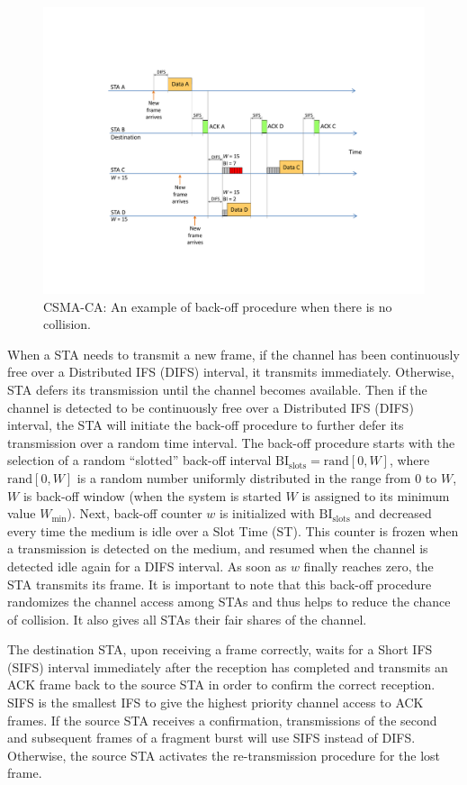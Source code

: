 \begin{figure}[!t]
	\centering
	\includegraphics[width=0.9\columnwidth]{figures2/CSMA-CA-back-off-no-collision}
	\caption{CSMA-CA: An example of back-off procedure when there is no collision.}
	\label{figs:CSMA-CA-back-off-no-collision}
\end{figure}

When a STA needs to transmit a new frame, if the channel has been continuously free over a Distributed IFS (DIFS) interval, it transmits immediately. Otherwise, STA defers its transmission until the channel becomes available. Then if the channel is detected to be continuously free over a Distributed IFS (DIFS) interval, the STA will initiate the back-off procedure to further defer its transmission over a random time interval. The back-off procedure starts with the selection of a random ``slotted'' back-off interval $\mathrm{BI_{slots}} = \mathrm{rand}[0,W]$, where $\mathrm{rand}[0,W]$ is a random number uniformly distributed in the range from $0$ to $W$, $W$ is back-off window (when the system is started $W$ is assigned to its minimum value $W_{\min}$). Next, back-off counter $w$ is initialized with $\mathrm{BI_{slots}}$ and decreased every time the medium is idle over a Slot Time (ST). This counter is frozen when a transmission is detected on the medium, and resumed when the channel is detected idle again for a DIFS interval. As soon as $w$ finally reaches zero, the STA transmits its frame. It is important to note that this back-off procedure randomizes the channel access among STAs and thus helps to reduce the chance of collision. It also gives all STAs their fair shares of the channel.

The destination STA, upon receiving a frame correctly, waits for a Short IFS (SIFS) interval immediately after the reception has completed and transmits an ACK frame back to the source STA in order to confirm the correct reception. SIFS is the smallest IFS to give the highest priority channel access to ACK frames. If the source STA receives a confirmation, transmissions of the second and subsequent frames of a fragment burst will use SIFS instead of DIFS. Otherwise, the source STA activates the re-transmission procedure for the lost frame.

